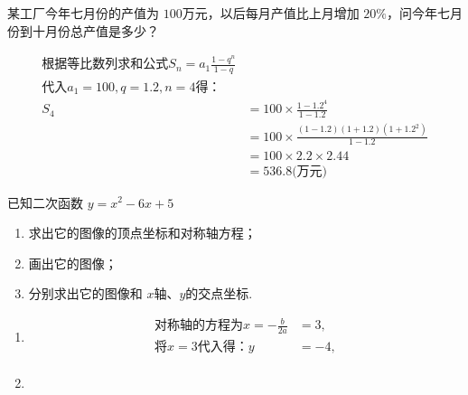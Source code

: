 \documentclass[answers]{exam}
\begin{document}
\begin{questions}
	\question 某工厂今年七月份的产值为 \( 100 \)万元，以后每月产值比上月增加 \( 20\%
	\)，问今年七月份到十月份总产值是多少？

	\begin{solution}
		\begin{align*}
			\text{根据等比数列求和公式} S_n = a_1\frac{1- q^n}{1-q}                    \\
			\text{代入}  a_1 = 100, q = 1.2, n = 4  \text{得：}                  \\
			S_4 & = 100 \times \frac{1 - 1.2^4}{1 - 1.2}                     \\
			    & = 100 \times \frac{(1 - 1.2)(1 + 1.2)(1 + 1.2^2)}{1 - 1.2} \\
			    & = 100 \times 2.2 \times 2.44                               \\
			    & = 536.8 \text{(万元)}
		\end{align*}

	\end{solution}

	\question 已知二次函数 \( y = x^2 - 6x + 5 \)
	\begin{enumerate}[label=(\arabic*)]
		\item 求出它的图像的顶点坐标和对称轴方程；
		\item 画出它的图像；
		\item 分别求出它的图像和 \( x \)轴、$ y $的交点坐标.
	\end{enumerate}

	\begin{solution}
		\begin{enumerate}[label=(\arabic*)]
			\item
			      \begin{align*}
				      \text{对称轴的方程为} x = -\frac{b}{2a} & = 3,  \\
				      \text{将} x = 3 \text{代入得：} y     & = -4, \\
			      \end{align*}
			\item
			      \begin{center}
			      \end{center}


\end{enumerate}
\end{solution}
\end{questions}
\end{document}
